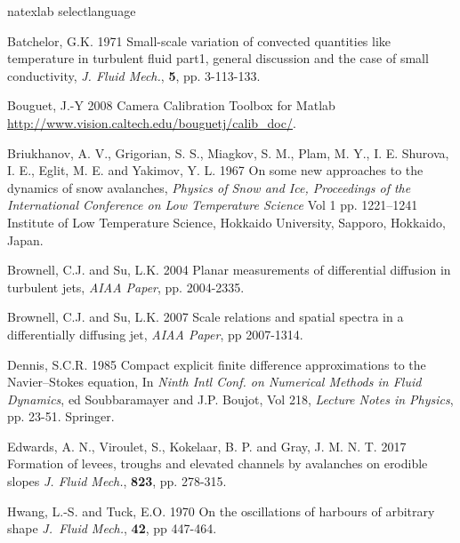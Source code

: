 \documentclass[lineno]{JFM-FLM_Au}
\begin{document}
\begin{thebibliography}{}
\expandafter\ifx\csname natexlab\endcsname\relax
\def\natexlab#1{#1}\fi
\expandafter\ifx\csname selectlanguage\endcsname\relax
\def\selectlanguage#1{\relax}\fi

{\sc Batchelor, G.K.} 1971 {Small-scale variation of convected quantities like temperature in turbulent fluid part1, general discussion and the case of small conductivity}, {\it J. Fluid Mech.}, {\bf 5}, pp. 3-113-133.

{\sc Bouguet, J.-Y} 2008 Camera Calibration Toolbox for Matlab {\url{http://www.vision.caltech.edu/bouguetj/calib_doc/}}.

{\sc Briukhanov, A. V.,   Grigorian, S. S., Miagkov,  S. M., Plam, M. Y.,   I. E. Shurova, I. E.,   Eglit, M. E. and Yakimov, Y. L.} 1967
{On some new approaches to the dynamics of snow avalanches},
{\it Physics of Snow and Ice,  Proceedings of the International Conference on Low Temperature Science}
{Vol 1} pp. 1221--1241 {Institute of Low Temperature Science, Hokkaido University, Sapporo, Hokkaido, Japan}.

 {\sc Brownell,  C.J.  and Su,  L.K.} 2004  {Planar measurements of differential diffusion in turbulent jets}, {\it AIAA Paper},  pp. 2004-2335.

  {\sc Brownell, C.J. and  Su, L.K.} 2007 {Scale relations and spatial spectra in a differentially diffusing jet}, {\it AIAA Paper}, pp 2007-1314.

 {\sc  Dennis, S.C.R.} 1985 {Compact explicit finite difference approximations to the Navier--Stokes equation},  { In \it Ninth Intl Conf. on Numerical Methods in Fluid Dynamics},  {ed Soubbaramayer and J.P. Boujot},  {Vol 218}, {\it Lecture Notes in Physics}, pp. 23-51. Springer.

{\sc Edwards, A. N., Viroulet, S., Kokelaar, B. P. and Gray, J. M. N. T.} 2017 Formation of levees, troughs and elevated channels by avalanches on erodible slopes {\it J. Fluid Mech.}, {\bf 823}, pp. 278-315.

 {\sc Hwang,  L.-S.  and  Tuck, E.O.} 1970 On the oscillations of harbours of arbitrary shape {\it J.~Fluid Mech.}, {\bf42}, pp 447-464.


\end{thebibliography}
\end{document}
